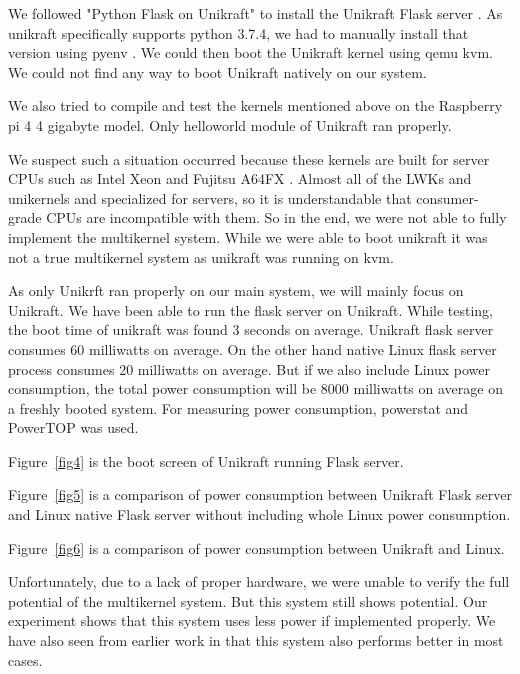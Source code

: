 \documentclass[11pt]{article}       %
\begin{document}
We followed "Python Flask on Unikraft" to install the Unikraft Flask server \cite{DEL18}. As unikraft specifically supports python 3.7.4, we had to manually install that version using pyenv \cite{DEL27}. We could then boot the Unikraft kernel using qemu kvm. We could not find any way to boot Unikraft natively on our system.


We also tried to compile and test the kernels mentioned above on the Raspberry pi 4 4 gigabyte model. Only helloworld module of Unikraft ran properly.  


We suspect such a situation occurred because these kernels are built for server CPUs such as Intel Xeon and Fujitsu A64FX \cite{DEL01} \cite{DEL02} \cite{DEL04}. Almost all of the LWKs and unikernels and specialized for servers, so it is understandable that consumer-grade CPUs are incompatible with them. So in the end, we were not able to fully implement the multikernel system. While we were able to boot unikraft it was not a true multikernel system as unikraft was running on kvm.


As only Unikrft ran properly on our main system, we will mainly focus on Unikraft. We have been able to run the flask server on Unikraft. While testing, the boot time of unikraft was found 3 seconds on average. Unikraft flask server consumes 60 milliwatts on average. On the other hand native Linux flask server process consumes 20 milliwatts on average. But if we also include Linux power consumption, the total power consumption will be 8000 milliwatts on average on a freshly booted system. For measuring power consumption, powerstat  \cite{DEL21} and PowerTOP \cite{DEL20} was used.

Figure~\ref{fig4} is the boot screen of Unikraft running Flask server.

Figure~\ref{fig5} is a comparison of power consumption between Unikraft Flask server and Linux native Flask server without including whole Linux power consumption. 


Figure~\ref{fig6} is a comparison of power consumption between Unikraft and Linux.


Unfortunately, due to a lack of proper hardware, we were unable to verify the full potential of the multikernel system. But this system still shows potential. Our experiment shows that this system uses less power if implemented properly. We have also seen from earlier work in \cite{DEL14} that this system also performs better in most cases. 



\end{document}
